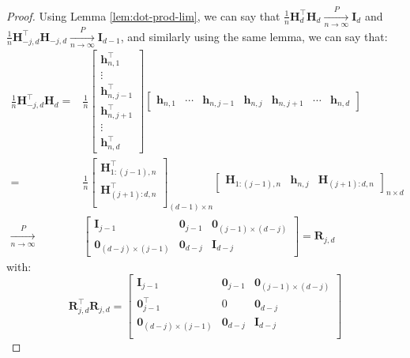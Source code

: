 \documentclass[10pt,a4paper]{amsart}
\newcommand{\bH}{\boldsymbol{H}}
\newcommand{\bI}{\boldsymbol{I}}
\newcommand{\bR}{\boldsymbol{R}}
\newcommand{\bh}{\boldsymbol{h}}
\newcommand{\bzero}{\boldsymbol{0}}
\newcommand{\pnlim}{\xrightarrow[n \to \infty]{P}}
\begin{document}
\begin{proof}
    Using Lemma \ref{lem:dot-prod-lim}, we can say that $\frac{1}{n}\bH_{d}^\top\bH_{d} \pnlim \bI_d$ and $\frac{1}{n}\bH_{-j,d}^\top\bH_{-j,d} \pnlim \bI_{d-1}$, and similarly using the same lemma, we can say that:
    \begin{equation}\label{eq:cross-basis-inner}
        \begin{split}
              \frac{1}{n}\bH_{-j,d}^\top\bH_{d} = & \frac{1}{n}\begin{bmatrix}
            \bh^\top_{n,1}\\
            \vdots\\
            \bh^\top_{n,j-1}\\
            \bh^\top_{n,j+1}\\
            \vdots\\
            \bh^\top_{n,d}
        \end{bmatrix}
        \begin{bmatrix}
    \bh_{n,1} & \cdots & \bh_{n,j-1}&\bh_{n,j}&\bh_{n,j+1}& \cdots& \bh_{n,d}
\end{bmatrix}\\
= & \frac{1}{n}\begin{bmatrix}
    \bH^\top_{1:(j-1),n}\\
     \bH^\top_{(j+1):d,n}\\
\end{bmatrix}_{(d-1)\times n}\begin{bmatrix}
    \bH_{1:(j-1),n} & \bh_{n,j} & \bH_{(j+1):d,n}
\end{bmatrix}_{n \times d}\\
\pnlim & \begin{bmatrix}
    \bI_{j-1} & \bzero_{j-1} & \bzero_{(j-1) \times (d-j)}\\
    \bzero_{(d-j)\times (j-1)} & \bzero_{d-j} & \bI_{d-j} 
\end{bmatrix} = \bR_{j,d}
        \end{split}
    \end{equation}
with:
\begin{equation}\label{eq:drop-inner-drop}
    \bR_{j,d}^\top\bR_{j,d} = \begin{bmatrix}
    \bI_{j-1} & \bzero_{j-1} & \bzero_{(j-1) \times (d-j)}\\
    \bzero^\top_{j-1} & 0 & \bzero_{d-j}\\
    \bzero_{(d-j) \times (j-1)} & \bzero_{d-j} & \bI_{d-j}\\
\end{bmatrix}

\end{equation}
\end{proof}
\end{document}
